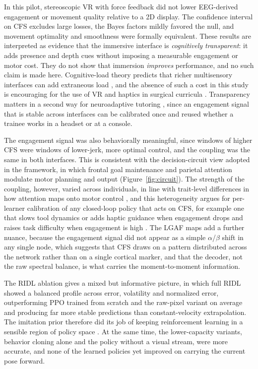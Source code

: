 \documentclass[utf8]{frontiers_suppmat}
\begin{document}
In this pilot, stereoscopic VR with force feedback did not lower EEG-derived engagement or movement quality relative to a 2D display. The confidence interval on CFS excludes large losses, the Bayes factors mildly favored the null, and movement optimality and smoothness were formally equivalent. These results are interpreted as evidence that the immersive interface is \emph{cognitively transparent}: it adds presence and depth cues without imposing a measurable engagement or motor cost. They do not show that immersion \emph{improves} performance, and no such claim is made here. Cognitive-load theory predicts that richer multisensory interfaces can add extraneous load \cite{jining2021lost,Sokolowska2023-cz}, and the absence of such a cost in this study is encouraging for the use of VR and haptics in surgical curricula \cite{Mao2021,Gawecki2020,9262701}. Transparency matters in a second way for neuroadaptive tutoring \cite{Battaglia2021,Bourdillon2023}, since an engagement signal that is stable across interfaces can be calibrated once and reused whether a trainee works in a headset or at a console.

The engagement signal was also behaviorally meaningful, since windows of higher CFS were windows of lower-jerk, more optimal control, and the coupling was the same in both interfaces. This is consistent with the decision-circuit view adopted in the framework, in which frontal goal maintenance and parietal attention modulate motor planning and output (Figure~\ref{fig:circuit}). The strength of the coupling, however, varied across individuals, in line with trait-level differences in how attention maps onto motor control \cite{Medaglia2020}, and this heterogeneity argues for per-learner calibration of any closed-loop policy that acts on CFS, for example one that slows tool dynamics or adds haptic guidance when engagement drops and raises task difficulty when engagement is high \cite{Attanasio2021,Tagliabue2023,Fiorini2022}. The LGAF maps add a further nuance, because the engagement signal did not appear as a simple $\alpha$/$\beta$ shift in any single node, which suggests that CFS draws on a pattern distributed across the network rather than on a single cortical marker, and that the decoder, not the raw spectral balance, is what carries the moment-to-moment information.

The RIDL ablation gives a mixed but informative picture, in which full RIDL showed a balanced profile across error, volatility and normalized error, outperforming PPO trained from scratch and the raw-pixel variant on average and producing far more stable predictions than constant-velocity extrapolation. The imitation prior therefore did its job of keeping reinforcement learning in a sensible region of policy space \cite{Barnoy2021,Xu2021}. At the same time, the lower-capacity variants, behavior cloning alone and the policy without a visual stream, were more accurate, and none of the learned policies yet improved on carrying the current pose forward.
\end{document}
